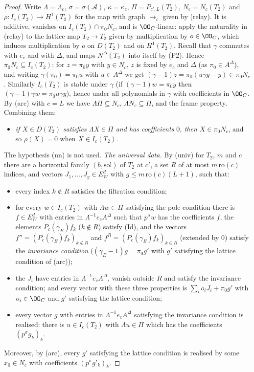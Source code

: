 \begin{proof}
Write $\Lambda=\Lambda_c$, $\sigma=\sigma(\mathcal A)$, $\kappa=\kappa_c$, $\Pi=P_{c',L}(T_2)$, $N_c=N_c(T_2)$ and
$\rho\colon I_c(T_2)\to H^1(T_2)$ for the map with graph $\mapsto_c$ given by (relay). It is additive, vanishes on
$I_c(T_2)\cap\pi_0N_c$, and is $\OO_C$-linear: apply the naturality in (relay) to the lattice map $T_2\to T_2$ given by
multiplication by $o\in\OO_C$, which induces multiplication by $o$ on $D(T_2)$ and on $H^1(T_2)$. Recall that $\gamma$
commutes with $e_c$ and with $\Delta$, and maps $N^\Delta(T_2)$ into itself by (P2). Hence $\pi_0N_c\subseteq I_c(T_2)$: for
$z=\pi_0y$ with $y\in N_c$, $z$ is fixed by $e_c$ and $\Delta$ (as $\pi_0\in A^\Delta$), and writing
$\gamma(\pi_0)=\pi_0u$ with $u\in A^\Delta$ we get $(\gamma-1)z=\pi_0(u\gamma y-y)\in\pi_0N_c$. Similarly $I_c(T_2)$ is stable
under $\gamma$ (if $(\gamma-1)w=\pi_0y$ then $(\gamma-1)\gamma w=\pi_0u\gamma y$), hence under all polynomials in $\gamma$
with coefficients in $\OO_C$.
By (arc) with $e=L$ we have $\Lambda\Pi\subseteq N_c$, $\Lambda N_c\subseteq\Pi$, and the frame property. Combining them:
\begin{itemize}
\item[(F)] \emph{if $X\in D(T_2)$ satisfies $\Lambda X\in\Pi$ and has coefficients $0$, then $X\in\pi_0N_c$}, and so
  $\rho(X)=0$ when $X\in I_c(T_2)$.
\end{itemize}
The hypothesis (nn) is not used. \emph{The universal data.} By (univ) for $T_2$, $m$ and $c$ there are a horizontal family $(b,\mathrm{sol})$ of $T_2$ at
$c'$, a set $R$ of at most $m\,\mathrm{ro}(c)$ indices, and vectors $J_1,\dots,J_g\in E_W^d$ with $g\le m\,\mathrm{ro}(c)(L+1)$,
such that:
\begin{itemize}
\item[(U0)] every index $k\notin R$ satisfies the filtration condition;
\item[(U1)] for every $w\in I_c(T_2)$ with $\Lambda w\in\Pi$ satisfying the pole condition there is $f\in E_W^d$ with
  entries in $\Lambda^{-1}e_cA^\Delta$ such that $p^\sigma w$ has the coefficients $f$, the elements $P_c(\gamma_E)f_k$
  ($k\notin R$) satisfy (Id), and the vectors $f''=(P_c(\gamma_E)f_k)_{k\notin R}$ and $f^R=(P_c(\gamma_E)f_k)_{k\in R}$
  (extended by $0$) satisfy the \emph{invariance condition} ($(\gamma_E-1)g=\pi_0g'$ with $g'$ satisfying the lattice
  condition of (arc));
\item[(U2)] the $J_i$ have entries in $\Lambda^{-1}e_cA^\Delta$, vanish outside $R$ and satisfy the invariance condition;
  and every vector with these three properties is $\sum_io_iJ_i+\pi_0g'$ with $o_i\in\OO_C$ and $g'$ satisfying the
  lattice condition;
\item[(U3)] every vector $g$ with entries in $\Lambda^{-1}e_cA^\Delta$ satisfying the invariance condition is realised:
  there is $u\in I_c(T_2)$ with $\Lambda u\in\Pi$ which has the coefficients $(p^\sigma g_k)_k$.
\end{itemize}
Moreover, by (arc), every $g'$ satisfying the lattice condition is realised by some $x_0\in N_c$ with coefficients
$(p^\sigma g'_k)_k$.


\end{proof}
